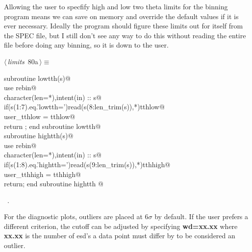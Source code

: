 \documentclass[10pt,a4paper,notitlepage]{article}
\newcommand{\code}[1]{\textbf{\textsf{#1}}} %
\begin{document}
\begin{flushleft}
\begin{minipage}{\linewidth}
\begin{list}{}{\setlength{\itemsep}{-\parsep}\setlength{\itemindent}{-\leftmargin}}
\item{}
\end{list}
\end{minipage}\vspace{4ex}
\end{flushleft}
Allowing the user to specfify high and low two theta limits for the binning
program means we can save on memory and override the default values if
it is ever necessary. 
Ideally the program should figure these limits out for itself from the SPEC
file, but I still don't see any way to do this without reading the entire
file before doing any binning, so it is down to the user.

\begin{flushleft} \small
\begin{minipage}{\linewidth}\label{scrap90}\raggedright\small
{} $\langle\,${\it limits}\nobreak\ {\footnotesize {80a}}$\,\rangle\equiv$
\vspace{-1ex}
\begin{list}{}{} \item
\mbox{}\verb@      subroutine lowtth(s)@\\
\mbox{}\verb@      use rebin@\\
\mbox{}\verb@      character(len=*),intent(in) :: s@\\
\mbox{}\verb@      if(s(1:7).eq.'lowtth=')read(s(8:len_trim(s)),*)tthlow@\\
\mbox{}\verb@      user_tthlow = tthlow@\\
\mbox{}\verb@      return ; end subroutine lowtth@\\
\mbox{}\verb@      subroutine hightth(s)@\\
\mbox{}\verb@      use rebin@\\
\mbox{}\verb@      character(len=*),intent(in) :: s@\\
\mbox{}\verb@      if(s(1:8).eq.'hightth=')read(s(9:len_trim(s)),*)tthhigh@\\
\mbox{}\verb@      user_tthhigh = tthhigh@\\
\mbox{}\verb@      return; end subroutine hightth                                       @{\NWsep}
\end{list}
\vspace{-1.5ex}
\footnotesize
\begin{list}{}{\setlength{\itemsep}{-\parsep}\setlength{\itemindent}{-\leftmargin}}
\item \NWtxtMacroRefIn\ .

\item{}
\end{list}
\end{minipage}\vspace{4ex}
\end{flushleft}
For the diagnostic plots, outliers are placed at $6\sigma$ by default. If
the user prefers a different criterion, the cutoff can be adjusted by 
specifying \code{wd=xx.xx} where \code{xx.xx} is the number of esd's a
data point must differ by to be considered an outlier.
\end{document}
